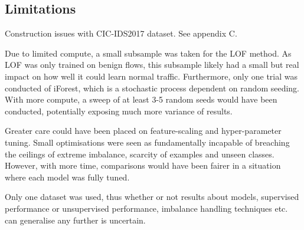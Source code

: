 \documentclass{article}
\begin{document}
\subsection{Limitations}
Construction issues with CIC-IDS2017 dataset. See appendix C.
\par Due to limited compute, a small subsample was taken for the LOF method.  As LOF was only trained on benign flows, this subsample likely had a small but real impact on how well it could learn normal traffic. Furthermore, only one trial was conducted of iForest, which is a stochastic process dependent on random seeding. With more compute, a sweep of at least 3-5 random seeds would have been conducted, potentially exposing much more variance of results.
\par Greater care could have been placed on feature-scaling and hyper-parameter tuning. Small optimisations were seen as fundamentally incapable of breaching the ceilings of extreme imbalance, scarcity of examples and unseen classes. However, with more time, comparisons would have been fairer in a situation where each model was fully tuned. 
\par Only one dataset was used, thus whether or not results about models, supervised performance or unsupervised performance, imbalance handling techniques etc. can generalise any further is uncertain.
\end{document}
